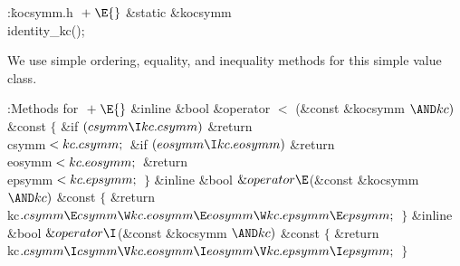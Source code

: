 \Y\B\4:\.{kocsymm.h }\X${}\mathrel+\E{}$\6
\&{static} \&{kocsymm} \\{identity\_kc}();\par
\fi

We use simple ordering, equality, and inequality methods for this
simple value class.

\Y\B\4:Methods for \X${}\mathrel+\E{}$\6
\&{inline} \&{bool} \&{operator} $<$ (\&{const} \&{kocsymm} ${}{\AND}\\{kc})$ %
\&{const} \6
${}\{{}$\1\6
\&{if} ${}(\\{csymm}\I\\{kc}.\\{csymm}){}$\1\5
\&{return} \\{csymm}${}<\\{kc}.\\{csymm};{}$\2\6
\&{if} ${}(\\{eosymm}\I\\{kc}.\\{eosymm}){}$\1\5
\&{return} \\{eosymm}${}<\\{kc}.\\{eosymm};{}$\2\6
\&{return} \\{epsymm}${}<\\{kc}.\\{epsymm};{}$\6
\4${}\}{}$\2\7
\&{inline} \&{bool} ${}\&{operator}{\E}{}$(\&{const} \&{kocsymm} ${}{\AND}%
\\{kc}){}$ \&{const}\1\1\2\2\6
${}\{{}$\1\6
\&{return} \\{kc}${}.\\{csymm}\E\\{csymm}\W\\{kc}.\\{eosymm}\E\\{eosymm}\W%
\\{kc}.\\{epsymm}\E\\{epsymm};{}$\6
\4${}\}{}$\2\7
\&{inline} \&{bool} ${}\&{operator}{\I}{}$(\&{const} \&{kocsymm} ${}{\AND}%
\\{kc}){}$ \&{const}\1\1\2\2\6
${}\{{}$\1\6
\&{return} \\{kc}${}.\\{csymm}\I\\{csymm}\V\\{kc}.\\{eosymm}\I\\{eosymm}\V%
\\{kc}.\\{epsymm}\I\\{epsymm};{}$\6
\4${}\}{}$\2\par
\fi

